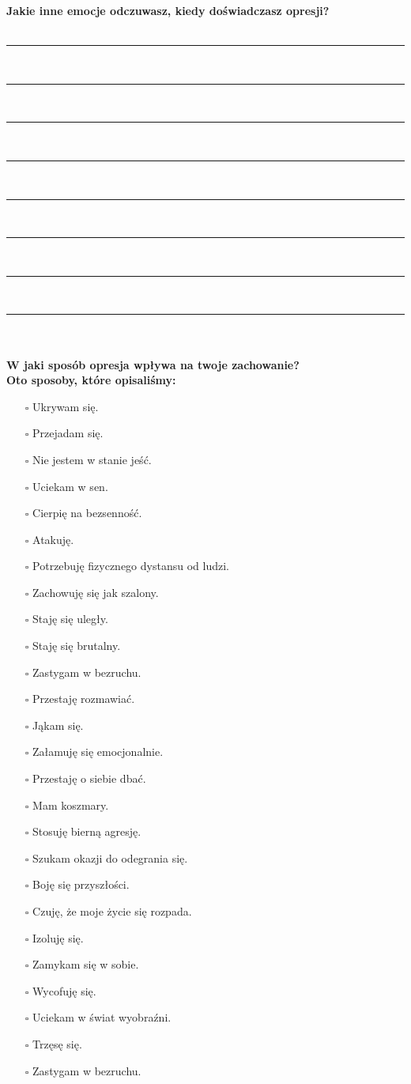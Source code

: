 \newpage
\noindent
\textcolor{ProcessBlue}{\textbf{\Large{Jakie inne emocje odczuwasz, kiedy doświadczasz opresji?}}}\\\\
\noindent\rule{\textwidth}{1pt}\\
\noindent\rule{\textwidth}{1pt}\\
\noindent\rule{\textwidth}{1pt}\\
\noindent\rule{\textwidth}{1pt}\\
\noindent\rule{\textwidth}{1pt}\\
\noindent\rule{\textwidth}{1pt}\\
\noindent\rule{\textwidth}{1pt}\\
\noindent\rule{\textwidth}{1pt}\\\\

\noindent\textcolor{ProcessBlue}{\textbf{\Large{W jaki sposób opresja wpływa na twoje zachowanie?}}}\\
\textbf{\large{Oto sposoby, które opisaliśmy:}}
\begin{multicols}{2}
\begin{itemize}
\item[$\square$]{Ukrywam się.}
\item[$\square$]{Przejadam się.}
\item[$\square$]{Nie jestem w stanie jeść.}
\item[$\square$]{Uciekam w sen.}
\item[$\square$]{Cierpię na bezsenność.}
\item[$\square$]{Atakuję.}
\item[$\square$]{Potrzebuję fizycznego dystansu od ludzi.}
\item[$\square$]{Zachowuję się jak szalony.}
\item[$\square$]{Staję się uległy.}
\item[$\square$]{Staję się brutalny.}
\item[$\square$]{Zastygam w bezruchu.}
\item[$\square$]{Przestaję rozmawiać.}
\item[$\square$]{Jąkam się.}
\item[$\square$]{Załamuję się emocjonalnie.}
\item[$\square$]{Przestaję o siebie dbać.}
\item[$\square$]{Mam koszmary.}
\item[$\square$]{Stosuję bierną agresję.}
\item[$\square$]{Szukam okazji do odegrania się.}
\item[$\square$]{Boję się przyszłości.}
\item[$\square$]{Czuję, że moje życie się rozpada.}
\item[$\square$]{Izoluję się.}
\item[$\square$]{Zamykam się w sobie.}
\item[$\square$]{Wycofuję się.}
\item[$\square$]{Uciekam w świat wyobraźni.}
\item[$\square$]{Trzęsę się.}
\item[$\square$]{Zastygam w bezruchu.}
\end{itemize}
\end{multicols}



